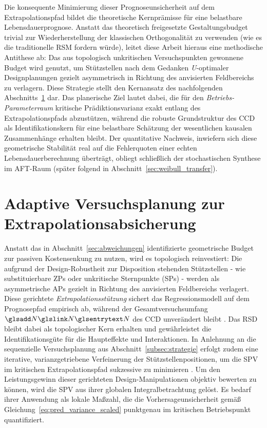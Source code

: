 Die konsequente Minimierung dieser Prognoseunsicherheit auf dem Extrapolationspfad bildet die theoretische Kernprämisse für eine belastbare Lebensdauerprognose.
Anstatt das theoretisch freigesetzte Gestaltungsbudget trivial zur Wiederherstellung der klassischen Orthogonalität zu verwenden (wie es die traditionelle \ac{RSM} fordern würde), leitet diese Arbeit hieraus eine methodische Antithese ab:
Das aus topologisch unkritischen Versuchspunkten gewonnene Budget wird genutzt, um Stützstellen nach dem Gedanken \textit{U}-optimaler Designplanungen gezielt asymmetrisch in Richtung des anvisierten Feldbereichs zu verlagern.
Diese Strategie stellt den Kernansatz des nachfolgenden Abschnitts~\ref{sec:adaptive_planung} dar.
Das planerische Ziel lautet dabei, die für den \textit{Betriebs-Parameterraum} kritische Prädiktionsvarianz exakt entlang des Extrapolationspfads abzustützen, während die robuste Grundstruktur des \ac{CCD} als Identifikationskern für eine belastbare Schätzung der wesentlichen kausalen Zusammenhänge erhalten bleibt.
Der quantitative Nachweis, inwiefern sich diese geometrische Stabilität real auf die Fehlerquoten einer echten Lebensdauerberechnung überträgt, obliegt schließlich der stochastischen Synthese im \ac{AFT}-Raum (später folgend in Abschnitt~\ref{sec:weibull_transfer}).


\section{Adaptive Versuchsplanung zur Extrapolationsabsicherung} \label{sec:adaptive_planung}

Anstatt das in Abschnitt~\ref{sec:abweichungen} identifizierte geometrische Budget zur passiven Kostensenkung zu nutzen, wird es topologisch reinvestiert:
Die aufgrund der Design-Robustheit zur Disposition stehenden Stützstellen - wie substituierbare \acp{ZP} oder unkritische Sternpunkte (\acp{SP}) - werden als asymmetrische \acp{AP} gezielt in Richtung des anvisierten Feldbereichs verlagert.
Diese gerichtete \textit{Extrapolationsstützung} sichert das Regressionsmodell auf dem Prognosepfad empirisch ab, während der Gesamtversuchsumfang $\sym{N}$ des \ac{CCD} unverändert bleibt \cite{Arndt.2024,Arndt.2025b,Arndt.2025}.
Das \ac{RSD} bleibt dabei als topologischer Kern erhalten und gewährleistet die Identifikationsgüte für die Haupteffekte und Interaktionen.
In Anlehnung an die sequenzielle Versuchsplanung aus Abschnitt~\ref{subsec:strategie} erfolgt zudem eine iterative, varianzgetriebene Verfeinerung der Stützstellenpositionen, um die \ac{SPV} im kritischen Extrapolationspfad sukzessive zu minimieren \cite{Arndt.2025}.
Um den Leistungsgewinn dieser gerichteten Design-Manipulationen objektiv bewerten zu können, wird die \ac{SPV} aus ihrer globalen Integralbetrachtung gelöst.
Es bedarf ihrer Anwendung als lokale Maßzahl, die die Vorhersageunsicherheit gemäß Gleichung~\ref{eq:pred_variance_scaled} punktgenau im kritischen Betriebspunkt quantifiziert.


